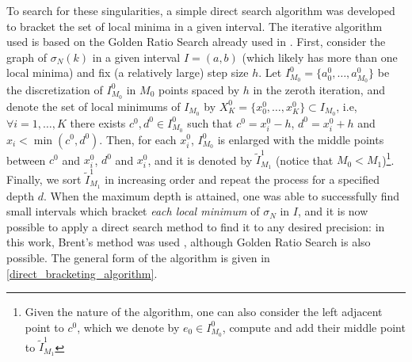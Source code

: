 To search for these singularities, a simple direct search algorithm was developed to bracket the set of local minima in a given interval. The iterative algorithm used is based on the Golden Ratio Search already used in \cite{alves2005method}. First, consider the graph of \(\sigma_N(k)\) in a given interval \(I=(a, b)\) (which likely has more than one local minima) and fix (a relatively large) step size \(h\). Let \(I_{M_0}^0 = \{a_0^0, \dots, a_{M_0}^0\}\) be the discretization of \(I_{M_0}^0\) in \({M_0}\) points spaced by \(h\) in the zeroth iteration, and denote the set of local minimums of \(I_{M_0}\) by \(X^0_K = \{x_0^0, \dots, x_K^0\} \subset I_{M_0}\), i.e, \(\forall i = 1,\dots, K\) there exists \(c^0, d^0 \in I_{M_0}^0\) such that \(c^0 = x_i^0 - h\), \(d^0 = x_i^0 + h\) and \(x_i < \min(c^0, d^0) \). Then, for each \(x_i^0\), \(I_{M_0}^0\) is enlarged with the middle points between \(c^0\) and \(x_i^0\), \(d^0\) and \(x_i^0\), and it is denoted by \(\tilde{I}_{M_1}^1\) (notice that \(M_0 < M_1\))\footnote{Given the nature of the algorithm, one can also consider the left adjacent point to \(c^0\), which we denote by \(e_0 \in I^0_{M_0}\), compute and add their middle point to \(\tilde{I}_{M_1}^1\)}. Finally, we sort \(\tilde{I}_{M_1}^1\) in increasing order and repeat the process for a specified depth \(d\). When the maximum depth is attained, one was able to successfully find small intervals which bracket \textit{each local minimum} of \(\sigma_N\) in \(I\), and it is now possible to apply a direct search method to find it to any desired precision: in this work, Brent's method was used \cite{brent1971algorithm}, although Golden Ratio Search is also possible. The general form of the algorithm is given in \ref{direct_bracketing_algorithm}.

